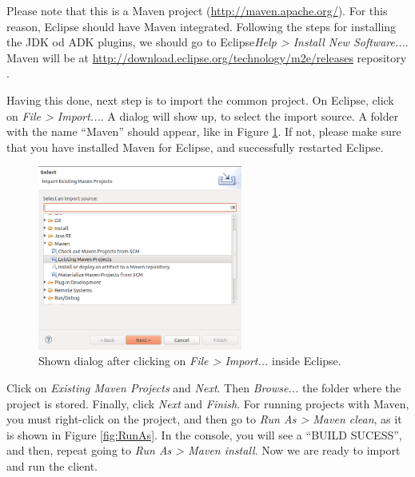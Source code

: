 \documentclass[a4paper,11pt]{book}
\begin{document}
Please note that this is a Maven project (\url{http://maven.apache.org/}). For this reason, Eclipse should have Maven integrated. Following the steps for installing the JDK od ADK plugins, we should go to Eclipse\textit{Help > Install New Software...}. Maven will be at \url{http://download.eclipse.org/technology/m2e/releases} repository \cite{m2eclipse:site}.

Having this done, next step is to import the common project. On Eclipse, click on \textit{File > Import...}. A dialog will show up, to select the import source. A folder with the name ``Maven'' should appear, like in Figure \ref{fig:importdialog}. If not, please make sure that you have installed Maven for Eclipse, and successfully restarted Eclipse.

\begin{figure}
  \begin{center}
    \includegraphics[width=0.6\textwidth]{./Figures/importdialog.png}
    \caption{Shown dialog after clicking on \textit{File > Import...} inside Eclipse.}
    \label{fig:importdialog}
  \end{center}
\end{figure}

Click on \textit{Existing Maven Projects} and \textit{Next}. Then \textit{Browse...} the folder where the project is stored. Finally, click \textit{Next} and \textit{Finish}. For running projects with Maven, you must right-click on the project, and then go to \textit{Run As > Maven clean}, as it is shown in Figure \ref{fig:RunAs}. In the console, you will see a ``BUILD SUCESS'', and then, repeat going to \textit{Run As > Maven install}. Now we are ready to import and run the client.
\end{document}
